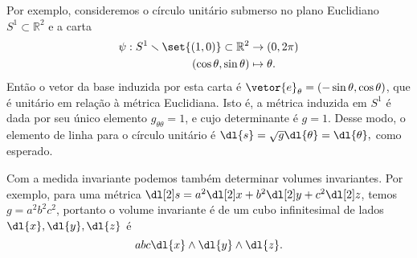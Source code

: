 Por exemplo, consideremos o círculo unitário submerso no plano Euclidiano \(S^1 \subset \mathbb{R}^2\) e a carta
\begin{align*}
    \psi : S^1 \smallsetminus \set{(1,0)} \subset \mathbb{R}^2 &\to (0, 2\pi)\\
    (\cos\theta,\sin\theta)&\mapsto \theta.
\end{align*}
Então o vetor da base induzida por esta carta é \(\vetor{e}_\theta = (-\sin\theta, \cos\theta)\), que é unitário em relação à métrica Euclidiana. Isto é, a métrica induzida em \(S^1\) é dada por seu único elemento \(g_{\theta\theta} = 1\), e cujo determinante é \(g = 1\). Desse modo, o elemento de linha para o círculo unitário é \(\dl{s} = \sqrt{g}\dl{\theta} = \dl{\theta},\) como esperado.

Com a medida invariante podemos também determinar volumes invariantes. Por exemplo, para uma métrica \(\dl[2]s = a^2 \dl[2]x + b^2\dl[2]y + c^2\dl[2]z\), temos \(g = a^2b^2c^2\), portanto o volume invariante é de um cubo infinitesimal de lados \(\dl{x}, \dl{y}, \dl{z}\) é
\[abc \dl{x}\wedge\dl{y}\wedge\dl{z}.\]
